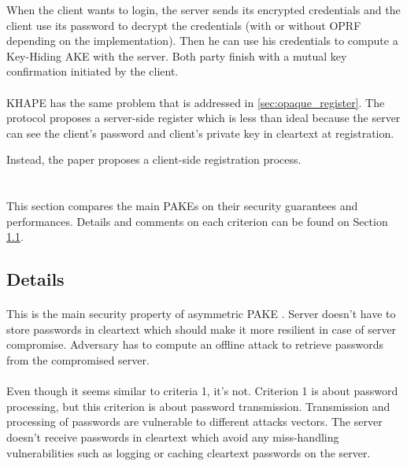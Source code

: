 \documentclass[../report.tex]{subfiles}
\begin{document}
When the client wants to login, the server sends its encrypted credentials and the client use its password to decrypt the credentials (with or without OPRF depending on the implementation). Then he can use his credentials to compute a Key-Hiding AKE with the server.
Both party finish with a mutual key confirmation initiated by the client.


\paragraph{}
KHAPE has the same problem that is addressed in \ref{sec:opaque_register}.
The protocol proposes a server-side register which is less than ideal because the server can see the client’s password and client's private key in cleartext at registration.

Instead, the paper proposes a client-side registration process.






\section{}

This section compares the main PAKEs on their security guarantees and performances. Details and comments on each criterion can be found on Section \ref{sec:comparison_details}.

 
\subsection{Details} \label{sec:comparison_details}



\paragraph{}
This is the main security property of asymmetric PAKE \cite{aPAKE_Formalized}. Server doesn't have to store passwords in cleartext which should make it more resilient in case of server compromise. Adversary has to compute an offline attack to retrieve passwords from the compromised server.

\paragraph{}
Even though it seems similar to criteria 1, it's not. Criterion 1 is about password processing, but this criterion is about password transmission. Transmission and processing of passwords are vulnerable to different attacks vectors.
The server doesn't receive passwords in cleartext which avoid any miss-handling vulnerabilities such as logging or caching cleartext passwords on the server.
\end{document}

